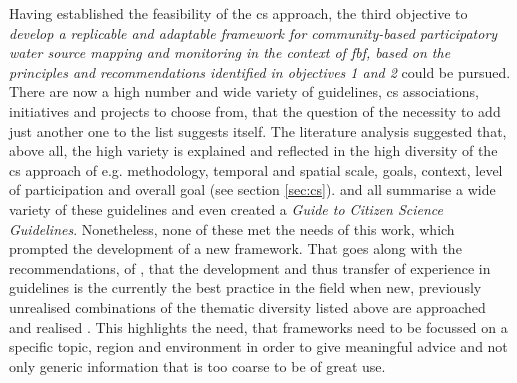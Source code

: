 Having established the feasibility of the \acrshort{cs} approach, the third objective to \textit{develop a replicable and adaptable framework for community-based participatory water source mapping and monitoring in the context of \acrlong{fbf}, based on the principles and recommendations identified in objectives 1 and 2} could be pursued. There are now a high number and wide variety of guidelines, \acrshort{cs} associations, initiatives and projects to choose from, that the question of the necessity to add just another one to the list suggests itself. The literature analysis suggested that, above all, the high variety is explained and reflected in the high diversity of the \acrshort{cs} approach of e.g. methodology, temporal and spatial scale, goals, context, level of participation and overall goal (see section \ref{sec:cs}). \autocite{fraislCitizenScienceEnvironmental2022, westonCommunityBasedWaterMonitoring2015} and \autocite{zhengCrowdsourcingMethodsData2018} all summarise a wide variety of these guidelines and \autocite{garciaFindingWhatYou2021} even created a \textit{Guide to Citizen Science Guidelines}. Nonetheless, none of these met the needs of this work, which prompted the development of a new framework. That goes along with the recommendations, of \autocite{garciaFindingWhatYou2021}, that the development and thus transfer of experience in guidelines is the currently the best practice in the field when new, previously unrealised combinations of the thematic diversity listed above are approached and realised \autocite{garciaFindingWhatYou2021}. This highlights the need, that frameworks need to be focussed on a specific topic, region and environment in order to give meaningful advice and not only generic information that is too coarse to be of great use.\newline

